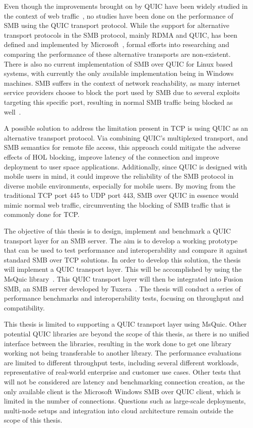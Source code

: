 \documentclass[english, 12pt, a4paper, elec, utf8, a-2b, online]{aaltothesis}
\begin{document}
Even though the improvements brought on by QUIC have been widely studied in the context
of web traffic~\cite{quic_better_for_what,evaluating_quic_perf,quic_and_tcp_performance},
no studies have been done on the performance of SMB using the QUIC transport protocol.
While the support for alternative transport protocols in the SMB protocol, mainly
RDMA and QUIC, has been defined and implemented by Microsoft~\cite{smb2}, formal
efforts into researching and comparing the performance of these alternative transports
are non-existent. There is also no current implementation of SMB over QUIC for Linux
based systems, with currently the only available implementation being in Windows machines.
SMB suffers in the context of network reachability, as many internet service providers
choose to block the port used by SMB due to several exploits targeting this specific port,
resulting in normal SMB traffic being blocked as well~\cite{bitag_port_blocking}.

A possible solution to address the limitation present in TCP is using
QUIC as an alternative transport protocol. Via combining QUIC's multiplexed transport,
and SMB semantics for remote file access, this approach could mitigate the adverse effects of
HOL blocking, improve latency of the connection and improve deployment to user space
applications. Additionally, since QUIC is designed with mobile users in mind, it could
improve the reliability of the SMB protocol in diverse mobile environments, especially
for mobile users. By moving from the traditional TCP port 445 to UDP port 443,
SMB over QUIC in essence would mimic normal web traffic, circumventing the blocking
of SMB traffic that is commonly done for TCP.

The objective of this thesis is to design, implement and benchmark a QUIC transport
layer for an SMB server. The aim is to develop a working prototype that can be used to
test performance and interoperability and compare it against standard SMB over TCP solutions.
In order to develop this solution, the thesis will implement a QUIC transport layer. This
will be accomplished by using the MsQuic library~\cite{msquic}. This QUIC transport layer
will then be integrated into Fusion SMB, an SMB server developed by Tuxera~\cite{fusion}.
The thesis will conduct a series of performance benchmarks and interoperability tests,
focusing on throughput and compatibility.

This thesis is limited to supporting a QUIC transport layer using MsQuic. Other
potential QUIC libraries are beyond the scope of this thesis, as there is no
unified interface between the libraries, resulting in the work done to get one
library working not being transferable to another library. The performance evaluations
are limited to different throughput tests, including several different workloads, representative of
real-world enterprise and customer use cases.
Other tests that will not be considered are latency and benchmarking connection creation,
as the only available client is the Microsoft Windows SMB over QUIC client, which is
limited in the number of connections. Questions such as large-scale deployments,
multi-node setups and integration into cloud architecture remain outside the scope
of this thesis.
\end{document}
